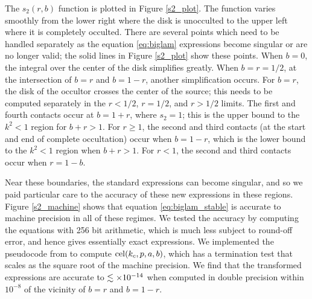 \documentclass[modern]{aastex61}
\begin{document}
The $s_2(r,b)$ function is plotted in Figure \ref{s2_plot}.  The
function varies smoothly from the lower right where the disk is
unocculted to the upper left where it is completely occulted.
There are several points which need to be handled separately as
the equation \ref{eq:biglam} expressions become singular or are
no longer valid;  the solid lines in Figure \ref{s2_plot} show
these points.  When $b=0$, the integral over the center of the
disk simplifies greatly.  When $b=r=1/2$, at the intersection of
$b=r$ and $b=1-r$, another simplification occurs.  For $b=r$,
the disk of the occultor crosses the center of the source;
this needs to be computed separately in the $r<1/2$, $r=1/2$,
and $r>1/2$ limits.  The first and fourth contacts occur at
$b=1+r$, where $s_2=1$;  this is the upper bound to the $k^2 < 1$
region for $b+r >1$.
For $r \ge 1$, the second and third contacts (at the start and
end of complete occultation) occur when $b=1-r$, which is the
lower  bound to the $k^2<1$ region when $b+r >1$.
For $r < 1$, the second and third contacts occur when $r=1-b$.

Near these boundaries, the standard \citet{MandelAgol2002} expressions
can become singular, and so we paid particular care to the accuracy of these
new expressions in these regions.  Figure \ref{s2_machine} shows
that equation \ref{eq:biglam_stable} is accurate to machine
precision in all of these regimes.
We tested the accuracy by computing the equations with 256 bit
arithmetic, which is much less subject to round-off error, and
hence gives essentially exact expressions.  We implemented the
pseudocode from \citet{Bulirsch1969} to compute ${\rm cel}(k_c,p,a,b)$,
which has a termination test that scales as the square root of
the machine precision.  We find that the transformed expressions
are accurate to $\lesssim \times 10^{-14}$ when computed in double precision
within $10^{-8}$ of the vicinity of $b=r$ and $b=1-r$.
\end{document}
